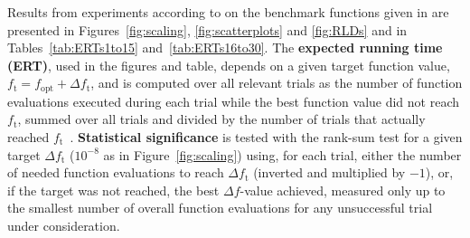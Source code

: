 \documentclass{sig-alternate}
\newcommand{\Df}{\ensuremath{\Delta f}}
\newcommand{\fopt}{\ensuremath{f_\mathrm{opt}}}
\newcommand{\ftarget}{\ensuremath{f_\mathrm{t}}}
\begin{document}
Results from experiments according to \cite{hansen2012exp} on the benchmark
functions given in \cite{wp200902_2010,hansen2012noi} are presented in
Figures~\ref{fig:scaling}, \ref{fig:scatterplots} and \ref{fig:RLDs} and
in Tables~\ref{tab:ERTs1to15} and~\ref{tab:ERTs16to30}. The \textbf{expected running time (ERT)}, used in the figures and table, depends on a
given target function value, $\ftarget=\fopt+\Delta\ftarget$, and is computed over all relevant trials
as the number of function evaluations executed during each trial while the best
function value did not reach \ftarget, summed over all trials
and divided by the number of trials that actually reached \ftarget\
\cite{hansen2012exp,price1997dev}. 
\textbf{Statistical significance} is tested with the rank-sum test for a given
target $\Delta\ftarget$ ($10^{-8}$ as in Figure~\ref{fig:scaling}) using,
for each trial, either the number of needed function evaluations to reach
$\Delta\ftarget$ (inverted and multiplied by $-1$), or, if the target was not
reached, the best $\Df$-value achieved, measured only up to the smallest number
of overall function evaluations for any unsuccessful trial under consideration. 
\end{document}
